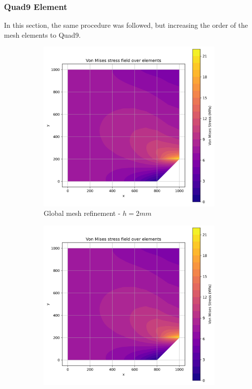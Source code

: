 \subsubsection{Quad9 Element}

In this section, the same procedure was followed, but increasing the order of the mesh elements to Quad9.

\begin{figure}[H]
  \centering
  \begin{subfigure}[b]{0.45\textwidth}
    \centering
    \includegraphics[width=\textwidth]{GRAFICOS/Quad9/2mm_global/resultados_von_mises.png}
    \caption{Global mesh refinement - $h=2mm$}
    \label{fig:img1}
  \end{subfigure}
  \hfill
  \begin{subfigure}[b]{0.45\textwidth}
    \centering
    \includegraphics[width=\textwidth]{GRAFICOS/Quad9/2mm_global/resultados_von_mises.png}

\end{subfigure}
\end{figure}
